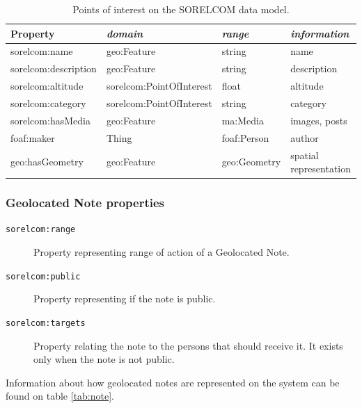 \begin{table}[ht]
  \centering
  \caption{Points of interest on the SORELCOM data model.}\label{tab:poi}
  \begin{tabular}{llll}
    \toprule
      \textbf{Property} & \emph{domain}  & \emph{range} & \emph{information}\\
    \midrule
      sorelcom:name & geo:Feature  & string & name \\
      sorelcom:description & geo:Feature & string  & description \\
      sorelcom:altitude & sorelcom:PointOfInterest & float & altitude \\
      sorelcom:category & sorelcom:PointOfInterest & string & category \\
      sorelcom:hasMedia & geo:Feature & ma:Media & images, posts \\
      foaf:maker & Thing & foaf:Person & author \\
      geo:hasGeometry & geo:Feature & geo:Geometry & spatial representation \\
    \bottomrule
  \end{tabular}
\end{table}

\subsubsection*{Geolocated Note properties}

\begin{description}
\item[\texttt{sorelcom:range}] Property representing range of action of a Geolocated Note. 
\item[\texttt{sorelcom:public}] Property representing if the note is public.
\item[\texttt{sorelcom:targets}] Property relating the note to the persons that should receive it. It exists only when the note is not public.
\end{description}

Information about how geolocated notes are represented on the system can be found on table \ref{tab:note}.

